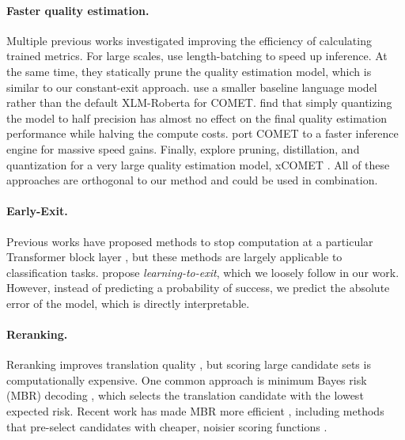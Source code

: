\paragraph{Faster quality estimation.}
Multiple previous works investigated improving the efficiency of calculating trained metrics.
For large scales, \citet{rei-etal-2022-searching} use length-batching to speed up inference.
At the same time, they statically prune the quality estimation model, which is similar to our constant-exit approach.
\citet{cheng2024bayesianoptimizationapproachmachine} use a smaller baseline language model rather than the default XLM-Roberta for COMET.
\citet{zouhar-etal-2024-pitfalls} find that simply quantizing the model to half precision has almost no effect on the final quality estimation performance while halving the compute costs.
\citet{gowda-etal-2023-cometoid,gowda-etal-2024-pymarian} port COMET to a faster inference engine for massive speed gains.
Finally, \citet{larionov2024xcometlitebridginggapefficiency} explore pruning, distillation, and quantization for a very large quality estimation model, xCOMET \citep{guerreiro-etal-2024-xcomet}.
All of these approaches are orthogonal to our method
and could be used in combination.

\paragraph{Early-Exit.}
Previous works have proposed methods to stop computation at a particular Transformer block layer \citep{bertpatience}, but these methods are largely applicable to classification tasks.
\citet{xin-etal-2021-berxit} propose \textit{learning-to-exit}, which we loosely follow in our work.
However, instead of predicting a probability of success, we predict the absolute error of the model, which is directly interpretable.

\paragraph{Reranking.}
Reranking improves translation quality \citep{freitag-etal-2022-high}, but scoring large candidate sets is computationally expensive. One common approach is minimum Bayes risk (MBR) decoding \citep[MBR;][]{eikema-aziz-2020-map}, which selects the translation candidate with the lowest expected risk. Recent work has made MBR more efficient \citep{cheng-vlachos-2023-faster,deguchi-etal-2024-centroid,trabelsi2024efficientminimumbayesrisk,vamvas-sennrich-2024-linear}, including methods that pre-select candidates with cheaper, noisier scoring functions \citep{fernandes-etal-2022-quality, eikema-aziz-2022-sampling}.

